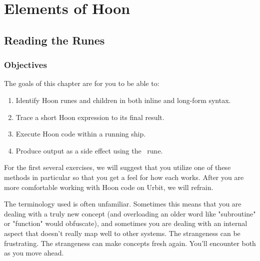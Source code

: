 \setchapterpreamble[u]{\margintoc}
\chapter{Elements of Hoon}


\section{Reading the Runes}

\subsection{Objectives}

The goals of this chapter are for you to be able to:

\begin{enumerate}
  \item  Identify Hoon runes and children in both inline and long-form syntax.
  \item  Trace a short Hoon expression to its final result.
  \item  Execute Hoon code within a running ship.
  \item  Produce output as a side effect using the \sigpam~rune.
\end{enumerate}


For the first several exercises, we will suggest that you utilize one of these methods in particular so that you get a feel for how each works.  After you are more comfortable working with Hoon code on Urbit, we will refrain.


The terminology used is often unfamiliar.  Sometimes this means that you are dealing with a truly new concept (and overloading an older word like "subroutine" or "function" would obfuscate), and sometimes you are dealing with an internal aspect that doesn't really map well to other systems.  The strangeness can be frustrating.  The strangeness can make concepts fresh again.  You'll encounter both as you move ahead.

